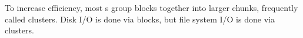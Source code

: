 To increase efficiency, most s group blocks together into larger chunks, frequently called clusters.
Disk I/O is done via blocks, but file system I/O is done via clusters.



